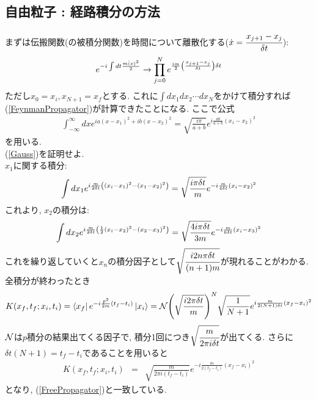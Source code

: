 \documentclass[10.5pt,a4paper]{jreport}
\begin{document}
\subsection{自由粒子 : 経路積分の方法}
まずは伝搬関数(の被積分関数)を時間について離散化する($\dot{x} = \cfrac{x_{j+1} - x_j}{\delta t}$):
\begin{eqnarray}
e^{-i\int dt\frac{m\dot(x)^2}{2}} \rightarrow \prod_{j=0}^Ne^{\frac{im}{2}\qty(\frac{x_{j+1} - x_j}{\delta t})\delta t}
\end{eqnarray}
ただし$x_0 = x_i, x_{N+1} = x_f$とする. これに$\int dx_1dx_2\cdots dx_N$をかけて積分すれば(\ref{FeynmanPropagator})が計算できたことになる. ここで公式
\begin{eqnarray}
  \int_{-\infty}^{\infty} dx e^{ia(x-x_1)^2 + ib(x-x_2)^2} = \sqrt{\frac{i\pi}{a+b}}e^{i\frac{ab}{a+b}(x_1-x_2)^2}\label{Gauss}
\end{eqnarray}
を用いる. \\

 (\ref{Gauss})を証明せよ.\\

$x_1$に関する積分:
\begin{eqnarray}
  \int dx_1 e^{i\frac{m}{2\delta t}\qty((x_i - x_1)^2-(x_1 - x_2)^2)} = \sqrt{\frac{i\pi\delta t}{m}}e^{-i\frac{m}{4\delta t}(x_i - x_2)^2}
\end{eqnarray}
これより, $x_2$の積分は:
\begin{eqnarray}
  \int dx_2 e^{i\frac{m}{2\delta t}\qty(\frac{1}{2}(x_i - x_2)^2-(x_2 - x_3)^2)} = \sqrt{\frac{4i\pi\delta t}{3m}}e^{-i\frac{m}{6\delta t}(x_i - x_3)^2}
\end{eqnarray}
これを繰り返していくと$x_n$の積分因子として$\sqrt{\cfrac{i2n\pi\delta t}{(n+1)m}}$が現れることがわかる. 全積分が終わったとき
\begin{eqnarray}
  K(x_f, t_f;x_i, t_i) = \bra{x_f}e^{-i\frac{\hat{p}^2}{2m}(t_f - t_i)}\ket{x_i} = {\cal N}\qty(\sqrt{\frac{i2\pi\delta t}{m}})^N\sqrt{\frac{1}{N+1}}e^{i\frac{m}{2(N+1)\delta t}(x_f - x_i)^2}\label{Kernel}
\end{eqnarray}
${\cal N}$は$p$積分の結果出てくる因子で, 積分1回につき$\sqrt{\cfrac{m}{2\pi i\delta t}}$が出てくる. さらに$\delta t(N+1) = t_f - t_i$であることを用いると
\begin{eqnarray}
  K(x_f, t_f;x_i, t_i ) &=&\sqrt{\frac{m}{2\pi i(t_f-t_i)}}e^{-i\frac{m}{2(t_f - t_i)}(x_f - x_i)^2}
\end{eqnarray}
となり, (\ref{FreePropagator})と一致している.\\
\end{document}
